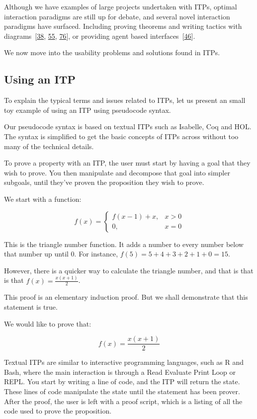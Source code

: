 \documentclass[
]{article}
\begin{document}
Although we have examples of large projects undertaken with ITPs,
optimal interaction paradigms are still up for debate, and several novel
interaction paradigms have surfaced. Including proving theorems and
writing tactics with
diagrams~{[}\protect\hyperlink{ref-grov_tinker_2018}{38},
\protect\hyperlink{ref-lin_understanding_2016}{55},
\protect\hyperlink{ref-shams_accessible_2018}{76}{]}, or providing agent
based
interfaces~{[}\protect\hyperlink{ref-hunter_agent-based_2005}{46}{]}.

We now move into the usability problems and solutions found in ITPs.

\hypertarget{sec:using_an_itp}{%
\subsection{Using an ITP}\label{sec:using_an_itp}}

To explain the typical terms and issues related to ITPs, let us present
an small toy example of using an ITP using pseudocode syntax.

Our pseudocode syntax is based on textual ITPs such as Isabelle, Coq and
HOL. The syntax is simplified to get the basic concepts of ITPs across
without too many of the technical details.

To prove a property with an ITP, the user must start by having a goal
that they wish to prove. You then manipulate and decompose that goal
into simpler subgoals, until they've proven the proposition they wish to
prove.

We start with a function:

\[
f(x) = 
  \begin{cases}
    f(x - 1) + x, & x > 0 \\
    0, & x = 0
  \end{cases}
\]

This is the triangle number function. It adds a number to every number
below that number up until 0. For instance,
\(f(5) = 5 + 4 + 3 + 2 + 1 + 0 = 15\).

However, there is a quicker way to calculate the triangle number, and
that is that is that \(f(x) = \frac{x(x + 1)}{2}\).

This proof is an elementary induction proof. But we shall demonstrate
that this statement is true.

We would like to prove that:

\[ f(x) = \frac{x(x + 1)}{2} \]

Textual ITPs are similar to interactive programming languages, such as R
and Bash, where the main interaction is through a Read Evaluate Print
Loop or REPL. You start by writing a line of code, and the ITP will
return the state. These lines of code manipulate the state until the
statement has been prover. After the proof, the user is left with a
proof script, which is a listing of all the code used to prove the
proposition.
\end{document}
